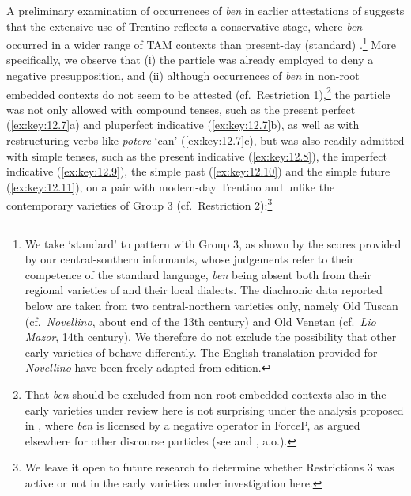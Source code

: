\documentclass[output=paper]{langsci/langscibook}
\begin{document}
A preliminary examination of occurrences of \emph{ben} in earlier attestations
of  suggests that the extensive use of Trentino reflects a
conservative stage, where \emph{ben} occurred in a wider range of \gls{TAM}
contexts than present-day (standard) .\footnote{We take
    \enquote*{standard}  to pattern with Group 3, as shown by the scores
    provided by our central-southern informants, whose judgements refer to
    their competence of the standard language, \emph{ben} being absent both
    from their regional varieties of  and their local  dialects.
    The diachronic data reported below are taken from two central-northern
    varieties only, namely Old Tuscan (cf.\ \emph{Novellino}, about end of the
    13th
    century) and Old Venetan (cf.\ \emph{Lio Mazor}, 14th century). We therefore
    do not exclude the possibility that other early varieties of 
    behave differently.  The English translation provided for \emph{Novellino}
    have been freely adapted from  edition.} More
    specifically, we observe that (i) the particle was already employed to deny
    a negative presupposition, and (ii) although occurrences of \emph{ben} in
    non-root embedded contexts do not seem to be attested (cf.\ Restriction
    1),\footnote{That \emph{ben} should be excluded from non-root embedded
        contexts also in the early varieties under review here is not
        surprising under the analysis proposed in \textcite{CognSchi2018b},
    where \emph{ben} is licensed by a negative operator in ForceP, as argued
elsewhere for other discourse particles (see \citealt{Coniglio2008} and
\citealt{Zimmermann2004,Zimmermann2011}, a.o.).} the particle was not only
allowed with compound tenses, such as the present perfect (\ref{ex:key:12.7}a) and pluperfect
indicative (\ref{ex:key:12.7}b), as well as with restructuring verbs like \emph{potere} ‘can’
(\ref{ex:key:12.7}c), but was also readily admitted with simple tenses, such as the present
indicative (\ref{ex:key:12.8}), the imperfect indicative (\ref{ex:key:12.9}), the simple past (\ref{ex:key:12.10}) and the
simple future (\ref{ex:key:12.11}), on a pair with modern-day Trentino and unlike the
contemporary  varieties of Group 3 (cf.\ Restriction 2):\footnote{We
leave it open to future research to determine whether Restrictions 3 was active
or not in the early varieties under investigation here.}
\end{document}
